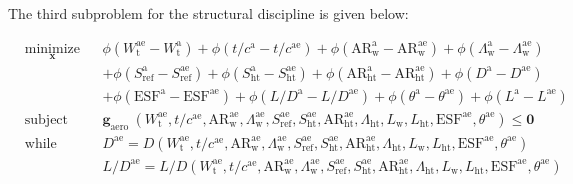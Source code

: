 \documentclass[11pt]{article}
\begin{document}
The third subproblem for the structural discipline is given below:

\begin{equation*}
    \begin{aligned}
        & \underset{\mathbf{x}}{\text{minimize}}
        & & \phi\left(W_{\mathrm{t}}^{\mathrm{ae}}-W_{\mathrm{t}}^{\mathrm{a}}\right)+\phi\left(t / c^{\mathrm{a}}-t / c^{\mathrm{ae}}\right)+\phi\left(\mathrm{AR}_{\mathrm{w}}^{\mathrm{a}}-\mathrm{AR}_{\mathrm{w}}^{\mathrm{ae}}\right)+\phi\left(\Lambda_{\mathrm{w}}^{\mathrm{a}}-\Lambda_{\mathrm{w}}^{\mathrm{ae}}\right) \\
    & & & +\phi\left(S_{\mathrm{ref}}^{\mathrm{a}}-S_{\mathrm{ref}}^{\mathrm{ae}}\right)+\phi\left(S_{\mathrm{ht}}^{\mathrm{a}}-S_{\mathrm{ht}}^{\mathrm{ae}}\right)+\phi\left(\mathrm{AR}_{\mathrm{ht}}^{\mathrm{a}}-\mathrm{AR}_{\mathrm{ht}}^{\mathrm{ae}}\right)+\phi\left(D^{\mathrm{a}}-D^{\mathrm{ae}}\right) \\
    & & & +\phi\left(\mathrm{ESF}^{\mathrm{a}}-\mathrm{ESF}^{\mathrm{ae}}\right)+\phi\left(L / D^{\mathrm{a}}-L / D^{\mathrm{ae}}\right)+\phi\left(\theta^{\mathrm{a}}-\theta^{\mathrm{ae}}\right)+\phi\left(L^{\mathrm{a}}-L^{\mathrm{ae}}\right)\\
    & \text{subject to}
        & & \mathbf{g}_{\text {aero }}\left(W_{\mathrm{t}}^{\mathrm{ae}}, t / c^{\mathrm{ae}}, \mathrm{AR}_{\mathrm{w}}^{\mathrm{ae}}, \Lambda_{\mathrm{w}}^{\mathrm{ae}}, S_{\mathrm{ref}}^{\mathrm{ae}}, S_{\mathrm{ht}}^{\mathrm{ae}}, \mathrm{AR}_{\mathrm{ht}}^{\mathrm{ae}}, \Lambda_{\mathrm{ht}}, L_{\mathrm{w}}, L_{\mathrm{ht}}, \mathrm{ESF}^{\mathrm{ae}}, \theta^{\mathrm{ae}}\right) \leq \mathbf{0} \\
    & \text{while solving}
        & &   D^{\mathrm{ae}}=D\left(W_{\mathrm{t}}^{\mathrm{ae}}, t / c^{\mathrm{ae}}, \mathrm{AR}_{\mathrm{w}}^{\mathrm{ae}}, \Lambda_{\mathrm{w}}^{\mathrm{ae}}, S_{\mathrm{ref}}^{\mathrm{ae}}, S_{\mathrm{ht}}^{\mathrm{ae}}, \mathrm{AR}_{\mathrm{ht}}^{\mathrm{ae}}, \Lambda_{\mathrm{ht}}, L_{\mathrm{w}}, L_{\mathrm{ht}}, \mathrm{ESF}^{\mathrm{ae}}, \theta^{\mathrm{ae}}\right) \\
    & & & L / D^{\mathrm{ae}}=L / D\left(W_{\mathrm{t}}^{\mathrm{ae}}, t / c^{\mathrm{ae}}, \mathrm{AR}_{\mathrm{w}}^{\mathrm{ae}}, \Lambda_{\mathrm{w}}^{\mathrm{ae}}, S_{\mathrm{ref}}^{\mathrm{ae}}, S_{\mathrm{ht}}^{\mathrm{ae}}, \mathrm{AR}_{\mathrm{ht}}^{\mathrm{ae}}, \Lambda_{\mathrm{ht}}, L_{\mathrm{w}}, L_{\mathrm{ht}}, \mathrm{ESF}^{\mathrm{ae}}, \theta^{\mathrm{ae}}\right) \\

\end{aligned}
\end{equation*}
\end{document}
